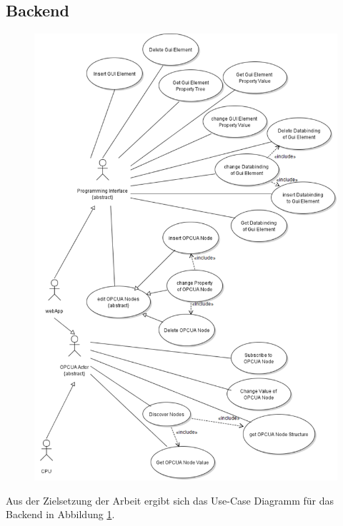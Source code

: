 \subsection{Backend}
\begin{figure}[ht]
  \centering
  \includegraphics[width=\textwidth]{content/hauptteil/systemEntwurf/res/backendUseCase.pdf}
  \caption[Use-Case Diagramm des Backends]{}
  \label{img:feUC}
\end{figure}
Aus der Zielsetzung der Arbeit ergibt sich das Use-Case Diagramm für das Backend in Abbildung \ref{img:feUC}.
